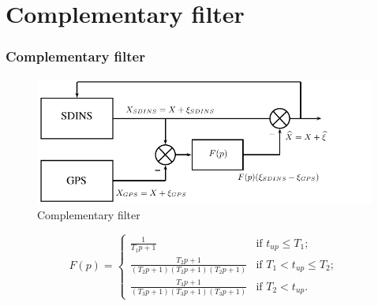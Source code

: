\documentclass[compress]{beamer}    %
\begin{document}
\section{Complementary filter} 
\begin{frame}%
\frametitle{Complementary filter}
\small
\begin{figure}[!t]
\centering
\includegraphics[scale=0.5]{f1}
\captionsetup{font=scriptsize,labelfont=scriptsize}
\caption{\tiny Complementary filter}
\label{fig:compl}
\end{figure}
\begin{equation}
\displaystyle F(p) = \left\{ 
    \begin{array}{ll}
       \displaystyle \frac{1}{T_{1} p+1} & \mbox{if $t_{up} \le T_{1}$};\\
       \displaystyle \frac{T_{2} p+1}{(T_{2} p+1)(T_{2} p+1)(T_{2} p+1)} & \mbox{if $T_{1} <t_{up} \le T_{2}$};\\
       \displaystyle \frac{T_{3} p+1}{(T_{3} p+1)(T_{3} p+1)(T_{3} p+1)}& \mbox{if $T_{2} < t_{up}$}.
    \end{array} 
\right.
\label{eq:comp_f}
\end{equation}
\end{frame}
\end{document}
